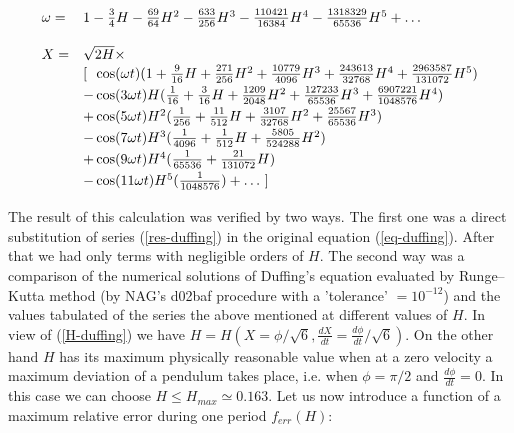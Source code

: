 \begin{equation}
\label{res-duffing}
\begin{array}{ll}

\omega =& 1
 -{\mathstrut 3 \over \mathstrut  4} H
 -{\mathstrut 69 \over \mathstrut  64} H^2
 -{\mathstrut 633 \over \mathstrut  256} H^3
 -{\mathstrut 110421 \over \mathstrut  16384} H^4
 -{\mathstrut 1318329 \over \mathstrut  65536} H^5 + \ldots\\

&\\
 
X =& \sqrt{2 H} \times \\
 &[ \ \ \cos(\omega t) (
   1
 +{\mathstrut 9 \over \mathstrut  16} H
 +{\mathstrut 271 \over \mathstrut  256} H^2
 +{\mathstrut 10779 \over \mathstrut  4096} H^3
 +{\mathstrut 243613 \over \mathstrut  32768} H^4
 +{\mathstrut 2963587 \over \mathstrut  131072} H^5)\\
 &-\cos(3 \omega t) H (
  {\mathstrut 1 \over \mathstrut  16}
 +{\mathstrut 3 \over \mathstrut  16} H
 +{\mathstrut 1209 \over \mathstrut  2048} H^2
 +{\mathstrut 127233 \over \mathstrut  65536} H^3
 +{\mathstrut 6907221 \over \mathstrut  1048576} H^4)\\
 &+\cos(5 \omega t) H^2 (
  {\mathstrut 1 \over \mathstrut  256}
 +{\mathstrut 11 \over \mathstrut  512} H
 +{\mathstrut 3107 \over \mathstrut  32768} H^2
 +{\mathstrut 25567 \over \mathstrut  65536} H^3)\\
 &-\cos(7 \omega t) H^3 (
  {\mathstrut 1 \over \mathstrut  4096}
 +{\mathstrut 1 \over \mathstrut  512} H
 +{\mathstrut 5805 \over \mathstrut  524288} H^2)\\
 &+\cos(9 \omega t) H^4 (
  {\mathstrut 1 \over \mathstrut  65536}
 +{\mathstrut 21 \over \mathstrut  131072} H)\\
 &-\cos(11 \omega t) H^5 (
  {\mathstrut 1 \over \mathstrut  1048576}) + \ldots \ ]

\end{array}
\end{equation}


The result of this calculation was verified  by two ways. The first 
one was a direct substitution of series (\ref{res-duffing}) in 
the original equation (\ref{eq-duffing}). After that we had only terms  
with negligible orders of $H$. The second way was a comparison of the
numerical solutions of Duffing's equation evaluated by Runge--Kutta 
method (by NAG's d02baf procedure with a 'tolerance' $= 10^{-12}$) and  
the values tabulated of the series the above mentioned at different 
values of $H$.
In view of (\ref{H-duffing}) we have $H=H(X=\phi/\sqrt{6},\frac{dX}{dt}
=\frac{d\phi}{dt}/\sqrt{6})$. On the other hand $H$ has its maximum 
physically reasonable value when at a zero velocity a maximum
deviation of a pendulum takes place, i.e. when $\phi = \pi/2$ and 
$\frac{d\phi}{dt}=0$. In this case we can choose $H \leq H_{max} 
\simeq 0.163$. Let us now introduce a function of a maximum relative 
error during one period $f_{err}(H)$:

